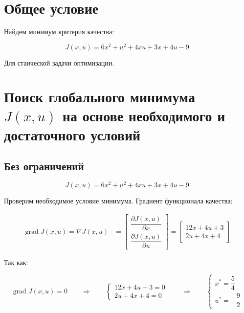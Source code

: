 \documentclass[a4paper,12pt]{article}
\begin{document}
	\newpage
	\tableofcontents
	
	\newpage \section{Общее условие}\label{sec:0}
	
	Найдем минимум критерия качества:
	
\begin{equation}
	J(x,u) = 6x^2 + u^2 + 4xu + 3x + 4u - 9
	\label{eq:J}
\end{equation}

Для стаической задачи оптимизации.
	
	
\newpage \section{Поиск глобального минимума \(J(x,u)\) на основе необходимого и достаточного условий}\label{sec:1}
	
	
\subsection{Без ограничений}	

\begin{equation}
	J(x,u) = 6x^2 + u^2 + 4xu + 3x + 4u - 9
\end{equation}

Проверим необходимое условие минимума. Градиент функционала качества:

\[\begin{aligned}
	\operatorname{grad} J(x,u) = \nabla J(x,u) &= 
	\begin{bmatrix}
		\dfrac{\partial J(x,u)}{\partial x} \\[10pt]
		\dfrac{\partial J(x,u)}{\partial u}
	\end{bmatrix}
	= \begin{bmatrix}
		12x + 4u + 3 \\[10pt]
		2u + 4x + 4
	\end{bmatrix}
    \end{aligned}
\]


Так как:

\[\operatorname{grad} J(x,u) = 0 \qquad \Longrightarrow \qquad
\begin{cases}
	12x + 4u + 3 = 0  \\
	2u + 4x + 4 = 0
\end{cases} \qquad \Longrightarrow \qquad
\begin{cases}
	x^* = \dfrac{5}{4}  \\[10pt]
	u^* = -\dfrac{9}{2}
\end{cases} 
\]
\end{document}
